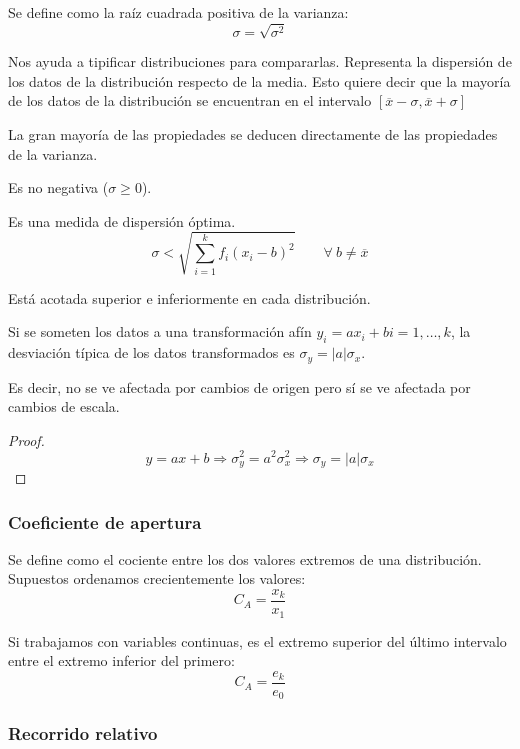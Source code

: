 Se define como la raíz cuadrada positiva de la varianza:
$$\sigma = \sqrt{\sigma^2}$$

Nos ayuda a tipificar distribuciones para compararlas. Representa la dispersión de los datos de la distribución respecto de la media. Esto quiere decir que la mayoría de los datos de la distribución se encuentran en el intervalo
$[\overline{x} - \sigma, \overline{x} + \sigma]$

La gran mayoría de las propiedades se deducen directamente de las propiedades de la varianza.

\begin{lema}
    Es no negativa ($\sigma \geq 0$).
\end{lema}
\begin{prop}
    Es una medida de dispersión óptima. $$\sigma < \sqrt{\sum\limits_{i=1}^k f_i(x_i - b)^2} \qquad \forall~b \neq \overline{x}$$
\end{prop}
\begin{prop}
    Está acotada superior e inferiormente en cada distribución.
\end{prop}
\begin{prop}
    Si se someten los datos a una transformación afín $y_i=ax_i+b$\qquad $i = 1, \dots ,k$, la desviación típica de los datos transformados es $\sigma_y = |a|\sigma_x$.

    Es decir, no se ve afectada por cambios de origen pero sí se ve afectada por cambios de escala.
\end{prop}
\begin{proof}
    \begin{equation*}
        y=ax+b \Longrightarrow \sigma_y^2 = a^2\sigma_x^2 \Longrightarrow \sigma_y = |a|\sigma_x
    \end{equation*}
\end{proof}

\subsubsection{Coeficiente de apertura}

Se define como el cociente entre los dos valores extremos de una distribución. Supuestos ordenamos crecientemente los valores:
$$C_A = \dfrac{x_k}{x_1}$$

Si trabajamos con variables continuas, es el extremo superior del último intervalo entre el extremo inferior del primero:
$$C_A = \dfrac{e_k}{e_0}$$

\subsubsection{Recorrido relativo}

